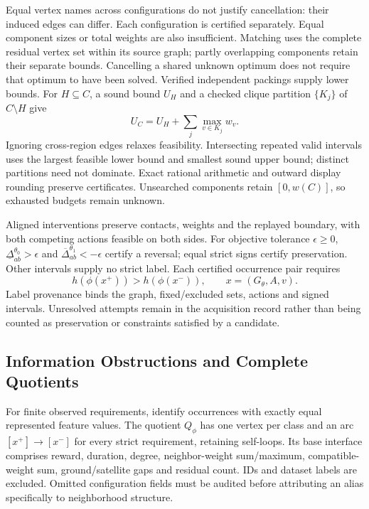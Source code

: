 Equal vertex names across configurations do not justify cancellation:
their induced edges can differ. Each configuration is certified separately.
Equal component sizes or total weights are also insufficient. Matching uses
the complete residual vertex set within its source graph; partly overlapping
components retain their separate bounds. Cancelling a shared unknown optimum
does not require that optimum to have been solved.
Verified independent packings supply lower bounds. For $H\subseteq C$,
a sound bound $U_H$ and a checked clique partition $\{K_j\}$ of $C\setminus H$
give
\begin{equation}
 U_C=U_H+\sum_j\max_{v\in K_j}w_v.
 \label{eq:clique-envelope}
\end{equation}
Ignoring cross-region edges relaxes feasibility. Intersecting repeated valid
intervals uses the largest feasible lower bound and smallest sound upper
bound; distinct partitions need not dominate. Exact rational arithmetic and
outward display rounding preserve certificates. Unsearched components retain
$[0,w(C)]$, so exhausted budgets remain unknown.

Aligned interventions preserve contacts, weights and the replayed boundary,
with both competing actions feasible on both sides. For objective tolerance
$\epsilon\geq0$, $\underline\Delta^{\theta_0}_{ab}>\epsilon$ and
$\overline\Delta^{\theta_1}_{ab}<-\epsilon$ certify a reversal; equal strict
signs certify preservation. Other intervals supply no strict label. Each
certified occurrence pair requires
\begin{equation}
 h(\phi(x^+))>h(\phi(x^-)),\qquad x=(G_\theta,A,v).
 \label{eq:strict-requirement}
\end{equation}
Label provenance binds the graph, fixed/excluded sets, actions and signed
intervals. Unresolved attempts remain in the acquisition record rather than
being counted as preservation or constraints satisfied by a candidate.

\subsection{Information Obstructions and Complete Quotients}
\label{sec:method:repair}
For finite observed requirements, identify occurrences with exactly equal
represented feature values. The quotient $Q_\phi$ has one vertex per class
and an arc $[x^+]\to[x^-]$ for every strict requirement, retaining self-loops.
Its base interface comprises reward, duration, degree, neighbor-weight
sum/maximum, compatible-weight sum, ground/satellite gaps and residual count.
IDs and dataset labels are excluded. Omitted configuration fields must be
audited before attributing an alias specifically to neighborhood structure.

